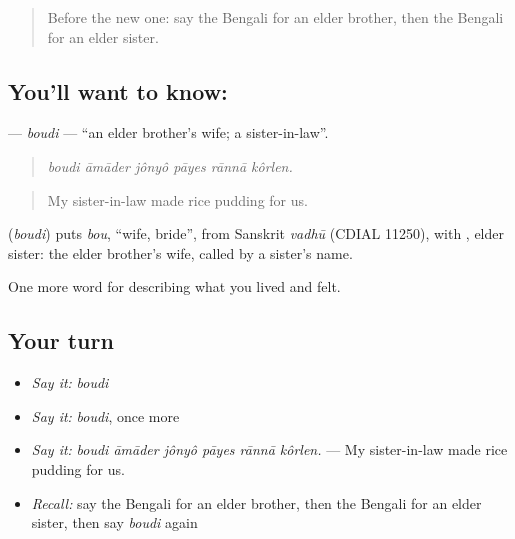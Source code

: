 \label{lesson:BN-C481-boudi}



\begin{quote}
Before the new one: say the Bengali for an elder brother, then the Bengali for an elder sister.
\end{quote}

\subsection*{You'll want to know: }
\textbf{} — \emph{boudi} — \textquotedblleft{}an elder brother's wife; a sister-in-law\textquotedblright{}.

\begin{quote}
     
\end{quote}

\begin{quote}
\emph{boudi āmāder jônyô pāyes rānnā kôrlen.}
\end{quote}

\begin{quote}
My sister-in-law made rice pudding for us.
\end{quote}

\begin{cousinweb}
\textbf{} (\emph{boudi}) puts \emph{bou}, \textquotedblleft{}wife, bride\textquotedblright{}, from Sanskrit \emph{vadhū} (CDIAL 11250), with , elder sister: the elder brother's wife, called by a sister's name.
\end{cousinweb}

\begin{grammarlens}[title={What you've built}]
One more word for describing what you lived and felt.
\end{grammarlens}

\subsection*{Your turn}
\begin{itemize}
\raggedright
  \item \emph{Say it:} \emph{boudi}
  \item \emph{Say it:} \emph{boudi}, once more
  \item \emph{Say it:} \emph{boudi āmāder jônyô pāyes rānnā kôrlen.} — My sister-in-law made rice pudding for us.
  \item \emph{Recall:} say the Bengali for an elder brother, then the Bengali for an elder sister, then say \emph{boudi} again
\end{itemize}

